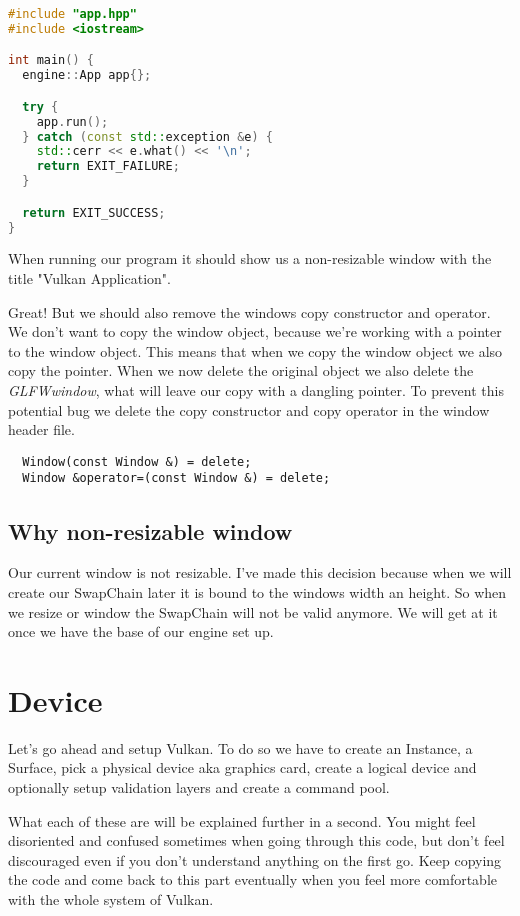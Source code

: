 \documentclass[12pt]{report} \usepackage{preamble}
\begin{document}
\begin{lstlisting}[language=C++]
#include "app.hpp"
#include <iostream>

int main() {
  engine::App app{};

  try {
    app.run();
  } catch (const std::exception &e) {
    std::cerr << e.what() << '\n';
    return EXIT_FAILURE;
  }

  return EXIT_SUCCESS;
}
\end{lstlisting}

When running our program it should show us a non-resizable window with the title "Vulkan Application".

Great! But we should also remove the windows copy constructor and operator. We don't want to copy the window object,
because we're working with a pointer to the window object. This means that when we copy the window object
we also copy the pointer. When we now delete the original object we also delete the \textit{GLFWwindow}, what
will leave our copy with a dangling pointer. To prevent this potential bug we delete
the copy constructor and copy operator in the window header file.

\begin{lstlisting}
  Window(const Window &) = delete;
  Window &operator=(const Window &) = delete;
\end{lstlisting}

\subsection{Why non-resizable window}

Our current window is not resizable. I've made this decision because when we will
create our SwapChain later it is bound to the windows width an height. So when we
resize or window the SwapChain will not be valid anymore. We will get at it once
we have the base of our engine set up.

\section{Device}

Let's go ahead and setup Vulkan. To do so we have to create an Instance,
a Surface, pick a physical device aka graphics card, create a logical device
and optionally setup validation layers and create a command pool.

What each of these are will be explained further in a second. You might
feel disoriented and confused sometimes when going through this code, but
don't feel discouraged even if you don't understand anything on the first go.
Keep copying the code and come back to this part eventually when you feel more
comfortable with the whole system of Vulkan.
\end{document}
